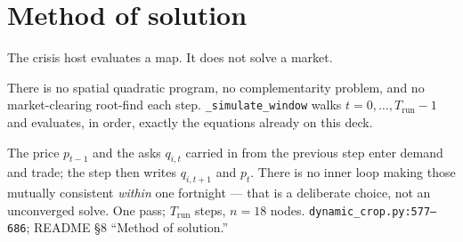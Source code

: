 \section{Method of solution}

\begin{frame}[label=method]{The crisis host evaluates a map. It does not solve a market.}

There is no spatial quadratic program, no complementarity problem, and no
market-clearing root-find each step. \texttt{\_simulate\_window} walks
$t=0,\ldots,T_{\mathrm{run}}-1$ and evaluates, in order, exactly the
equations already on this deck.

The price $p_{t-1}$ and the asks $q_{i,t}$ carried in from the previous
step enter demand and trade; the step then writes $q_{i,t+1}$ and $p_t$.
There is no inner loop making those mutually consistent \emph{within} one
fortnight --- that is a deliberate choice, not an unconverged solve.
{One pass; $T_{\mathrm{run}}$ steps, $n=18$ nodes.}
{\texttt{dynamic\_crop.py:577--686}; README \S8 ``Method of solution.''}
\end{frame}

